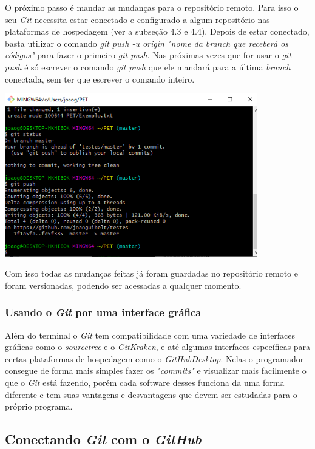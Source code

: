 \documentclass{article}
\begin{document}
O próximo passo é mandar as mudanças para o repositório remoto. Para isso o seu \textit{Git} necessita estar conectado e configurado a algum repositório nas plataformas de hospedagem (ver a subseção 4.3 e 4.4). Depois de estar conectado, basta utilizar o comando \textit{git push -u origin "nome da branch que receberá os códigos"} para fazer o primeiro \textit{git push}. Nas próximas vezes que for usar o \textit{git push} é só escrever o comando \textit{git push} que ele mandará para a última \textit{branch} conectada, sem ter que escrever o comando inteiro.   

\includegraphics[width = 11cm]{images/push.png}

Com isso todas as mudanças feitas já foram guardadas no repositório remoto e foram versionadas, podendo ser acessadas a qualquer momento.

\subsubsection{Usando o \textit{Git} por uma interface gráfica}

\hspace{4mm}Além do terminal o \textit{Git} tem compatibilidade com uma variedade de interfaces gráficas como o \textit{sourcetree} e o \textit{GitKraken}, e até algumas interfaces específicas para certas plataformas de hospedagem como o \textit{GitHubDesktop}. Nelas o programador consegue de forma mais simples fazer os \textit{"commits"} e visualizar mais facilmente o que o \textit{Git} está fazendo, porém cada software desses funciona da uma forma diferente e tem suas vantagens e desvantagens que devem ser estudadas para o próprio programa.

\subsection{Conectando \textit{Git} com o \textit{GitHub}}
\end{document}
